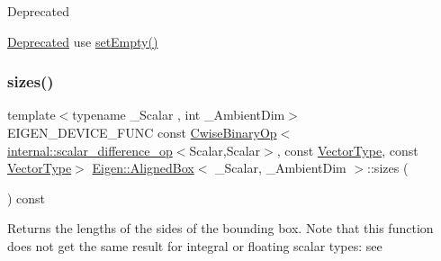 \begin{DoxyRefDesc}{Deprecated}
\item[\mbox{\hyperlink{deprecated__deprecated000027}{Deprecated}}]use \mbox{\hyperlink{class_eigen_1_1_aligned_box_ae946a0964de83d4e688fa462fe6d6725}{set\+Empty()}} \end{DoxyRefDesc}
\mbox{\label{class_eigen_1_1_aligned_box_a139c2e08625f54e4c6b0007257afdae2}} 
\subsubsection{\texorpdfstring{sizes()}{sizes()}}
{\footnotesize\ttfamily template$<$typename \+\_\+\+Scalar , int \+\_\+\+Ambient\+Dim$>$ \\
E\+I\+G\+E\+N\+\_\+\+D\+E\+V\+I\+C\+E\+\_\+\+F\+U\+NC const \mbox{\hyperlink{class_eigen_1_1_cwise_binary_op}{Cwise\+Binary\+Op}}$<$ \mbox{\hyperlink{struct_eigen_1_1internal_1_1scalar__difference__op}{internal\+::scalar\+\_\+difference\+\_\+op}}$<$Scalar,Scalar$>$, const \mbox{\hyperlink{class_eigen_1_1_matrix}{Vector\+Type}}, const \mbox{\hyperlink{class_eigen_1_1_matrix}{Vector\+Type}}$>$ \mbox{\hyperlink{class_eigen_1_1_aligned_box}{Eigen\+::\+Aligned\+Box}}$<$ \+\_\+\+Scalar, \+\_\+\+Ambient\+Dim $>$\+::sizes (\begin{DoxyParamCaption}{ }\end{DoxyParamCaption}) const\hspace{0.3cm}{\ttfamily [inline]}}

\begin{DoxyReturn}{Returns}
the lengths of the sides of the bounding box. Note that this function does not get the same result for integral or floating scalar types\+: see 
\end{DoxyReturn}
\mbox{\label{class_eigen_1_1_aligned_box_aa6d9ffc81bd77da631fef6559f45cf13}} 
